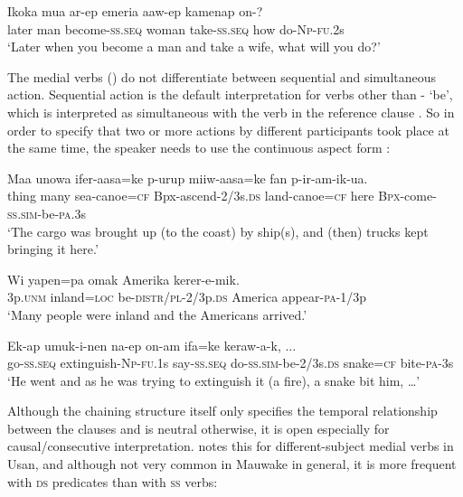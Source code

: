 \ea%
\label{ex:8:x1445}
\gll Ikoka  mua  ar-ep  emeria  aaw-ep  kamenap  on-? \\
later  man  become-\textsc{ss}.\textsc{seq} woman take-\textsc{ss}.\textsc{seq} how do-\textsc{Np}-\textsc{fu}.2s\\
\glt`Later when you become a man and take a wife, what will you do?'
\z


The  medial verbs () do not differentiate between sequential and simultaneous action. Sequential action  is the default interpretation for verbs other than - `be', which is interpreted as simultaneous with the verb in the reference clause . So in order to specify that two or more actions by different participants took place at the same time, the speaker needs to use the continuous aspect form :

\ea%
\label{ex:8:x1502}
\gll Maa  unowa  ifer-aasa=ke  p-urup miiw-aasa=ke fan  p-ir-am-ik-ua.\\
thing  many  sea-canoe=\textsc{cf} Bpx-ascend-2/3s.\textsc{ds} land-canoe=\textsc{cf} here \textsc{Bpx}-come-\textsc{ss}.\textsc{sim}-be-\textsc{pa}.3s\\
\glt`The cargo was brought up (to the coast) by ship(s), and (then) trucks kept bringing it here.'
\z


\ea%
\label{ex:8:x1503}
\gll Wi  yapen=pa  omak  Amerika  kerer-e-mik.\\
3p.\textsc{unm} inland=\textsc{loc} be-\textsc{distr}/\textsc{pl}-2/3p.\textsc{ds} America appear-\textsc{pa}-1/3p\\
\glt`Many people were inland and the Americans arrived.'
\z


\ea%
\label{ex:8:x1472}
\gll Ek-ap  umuk-i-nen  na-ep  on-am ifa=ke  keraw-a-k,  ...\\
go-\textsc{ss}.\textsc{seq} extinguish-\textsc{Np}-\textsc{fu}.1s  say-\textsc{ss}.\textsc{seq} do-\textsc{ss}.\textsc{sim}-be-2/3s.\textsc{ds} snake=\textsc{cf} bite-\textsc{pa}-3s\\
\glt`He went and as he was trying to extinguish it (a fire), a snake bit him, {\dots}'
\z


Although the chaining structure itself only specifies the temporal relationship between the clauses and is neutral otherwise, it is open especially for causal/consecutive interpretation. \citet[237]{Reesink1983b} notes this for different-subject medial verbs in Usan, and although not very common in Mauwake in general, it is more frequent with \textsc{ds} predicates than with \textsc{ss} verbs:

